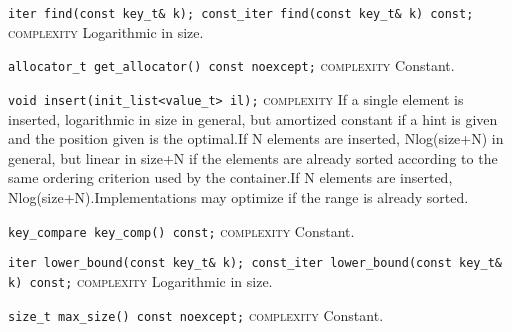 \noindent{}\hspace*{0.25em}\lstinline[basicstyle=\ttfamily\color{clime}]{iter find(const key_t& k); const_iter find(const key_t& k) const;} \textsc{complexity} Logarithmic in size.\\\vspace{-0.6em}

\noindent{}\hspace*{0.25em}\lstinline[basicstyle=\ttfamily\color{cgreen}]{allocator_t get_allocator() const noexcept;} \textsc{complexity} Constant.\\\vspace{-0.6em}

\noindent{}\hspace*{0.25em}\lstinline[basicstyle=\ttfamily\color{corange}]{void insert(init_list<value_t> il);} \textsc{complexity} If a single element is inserted, logarithmic in size in general, but amortized constant if a hint is given and the position given is the optimal.If N elements are inserted, Nlog(size+N) in general, but linear in size+N if the elements are already sorted according to the same ordering criterion used by the container.If N elements are inserted, Nlog(size+N).Implementations may optimize if the range is already sorted.\\\vspace{-0.6em}

\noindent{}\hspace*{0.25em}\lstinline[basicstyle=\ttfamily\color{cgreen}]{key_compare key_comp() const;} \textsc{complexity} Constant.\\\vspace{-0.6em}

\noindent{}\hspace*{0.25em}\lstinline[basicstyle=\ttfamily\color{clime}]{iter lower_bound(const key_t& k); const_iter lower_bound(const key_t& k) const;} \textsc{complexity} Logarithmic in size.\\\vspace{-0.6em}

\noindent{}\hspace*{0.25em}\lstinline[basicstyle=\ttfamily\color{cgreen}]{size_t max_size() const noexcept;} \textsc{complexity} Constant.\\\vspace{-0.6em}

